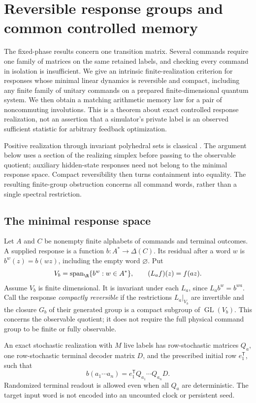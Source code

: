 \section{Reversible response groups and common controlled memory}\label{sec:r72-reversible}
The fixed-phase results concern one transition matrix. Several commands require one family of matrices on the same retained labels, and checking every command in isolation is insufficient. We give an intrinsic finite-realization criterion for responses whose minimal linear dynamics is reversible and compact, including any finite family of unitary commands on a prepared finite-dimensional quantum system. We then obtain a matching arithmetic memory law for a pair of noncommuting involutions. This is a theorem about exact controlled response realization, not an assertion that a simulator's private label is an observed sufficient statistic for arbitrary feedback optimization.

Positive realization through invariant polyhedral sets is classical \cite{Heller65,MonrasWinter14,ThonJaeger15}. The argument below uses a section of the realizing simplex before passing to the observable quotient; auxiliary hidden-state responses need not belong to the minimal response space. Compact reversibility then turns containment into equality. The resulting finite-group obstruction concerns all command words, rather than a single spectral restriction.

\subsection{The minimal response space}
Let $A$ and $C$ be nonempty finite alphabets of commands and terminal outcomes. A supplied response is a function $b:A^*\to\Delta(C)$. Its residual after a word $w$ is $b^w(z)=b(wz)$, including the empty word $\varnothing$. Put
\[
 V_b=\operatorname{span}_{\R}\{b^w:w\in A^*\},
 \qquad (L_af)(z)=f(az).
\]
Assume $V_b$ is finite dimensional. It is invariant under each $L_a$, since $L_ab^w=b^{wa}$. Call the response \emph{compactly reversible} if the restrictions $L_a|_{V_b}$ are invertible and the closure $G_b$ of their generated group is a compact subgroup of $\operatorname{GL}(V_b)$. This concerns the observable quotient; it does not require the full physical command group to be finite or fully observable.

An exact stochastic realization with $M$ live labels has row-stochastic matrices $Q_a$, one row-stochastic terminal decoder matrix $D$, and the prescribed initial row $e_1^{\mathsf T}$, such that
\begin{equation}\label{eq:r72-response}
 b(a_1\cdots a_n)=e_1^{\mathsf T}Q_{a_1}\cdots Q_{a_n}D.
\end{equation}
Randomized terminal readout is allowed even when all $Q_a$ are deterministic. The target input word is not encoded into an uncounted clock or persistent seed.

